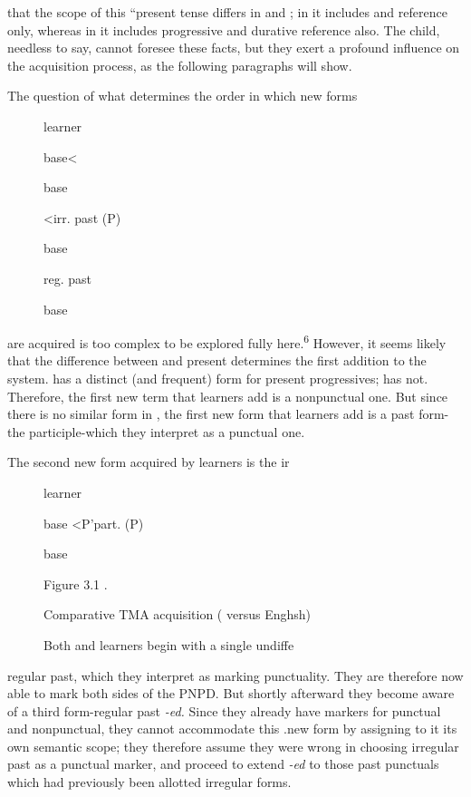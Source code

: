 
that the scope of this ``present tense differs in  and ; in  it includes  and  reference only, whereas in  it includes progressive and durative reference also. The child,
needless to say, cannot foresee these facts, but they exert a profound influence on the acquisition process, as the following paragraphs will show.

The question of what determines the order in which new forms

\begin{figure}
 learner

base{\textless}

base

{\textless}irr. past (P)

base

reg. past

base
\end{figure}

are acquired is too complex to be explored fully here.\textsuperscript{6} However, it seems likely that the difference between  and  present  determines the first addition to the system.  has a dis\-tinct (and frequent) form for present progressives;  has not. Therefore, the first new term that  learners add is a nonpunctual one. But since there is no similar form in , the first new form that  learners add is a past form-the participle-which they interpret as a punctual one.

The second new form acquired by  learners is the ir\-%
\begin{figure}
 learner

base {\textless}P{\textquotedbl}'part. (P)

base

Figure 3.1 .

Comparative TMA acquisition ( versus Enghsh)

Both  and  learners begin with a single undiffe
\end{figure}%
%
regular past, which they interpret as marking punctuality. They are therefore now able to mark both sides of the PNPD. But shortly after\-ward they become aware of a third form-regular past \textit{{}-ed.} Since they already have markers for punctual and nonpunctual, they cannot ac\-commodate this .new form by assigning to it its own semantic scope; they therefore assume they were wrong in choosing irregular past as a punctual marker, and proceed to extend \textit{{}-ed} to those past punc\-tuals which had previously been allotted irregular forms.

